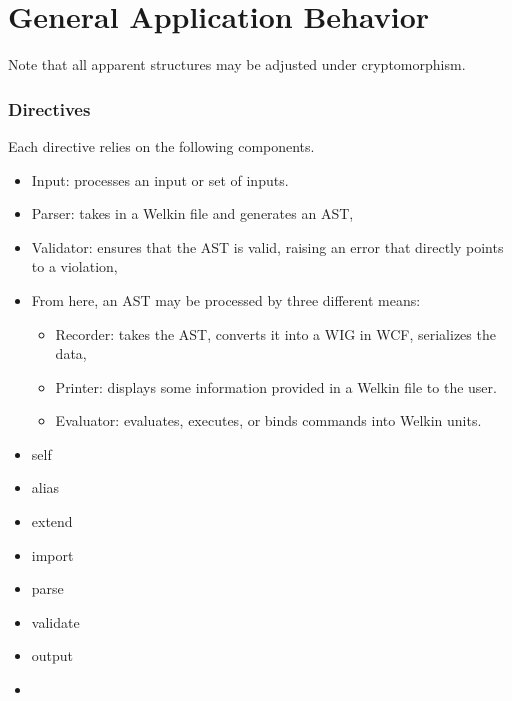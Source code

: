 \section{General Application Behavior}

Note that all apparent structures may be adjusted under cryptomorphism.


\subsubsection*{Directives}
Each directive relies on the following components.
\begin{itemize}
  \item Input: processes an input or set of inputs.
  \item Parser: takes in a Welkin file and generates an AST,
  \item Validator: ensures that the AST is valid, raising an error that directly points to a violation,
  \item From here, an AST may be processed by three different means:
		\begin{itemize}
		  \item Recorder: takes the AST, converts it into a WIG in WCF, serializes the data,
		  \item Printer: displays some information provided in a Welkin file to the user.
		  \item Evaluator: evaluates, executes, or binds commands into Welkin units.
		\end{itemize}
\end{itemize}


\begin{itemize}
  \item self
  \item alias
  \item extend
  \item import
  \item parse
  \item validate
  \item output
  \item
\end{itemize}



